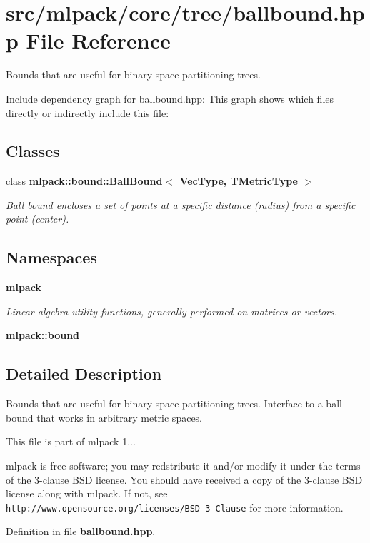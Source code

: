 \section{src/mlpack/core/tree/ballbound.hpp File Reference}
\label{ballbound_8hpp}


Bounds that are useful for binary space partitioning trees.  


Include dependency graph for ballbound.\-hpp\-:
This graph shows which files directly or indirectly include this file\-:
\subsection*{Classes}
\begin{DoxyCompactItemize}
\item 
class {\bf mlpack\-::bound\-::\-Ball\-Bound$<$ Vec\-Type, T\-Metric\-Type $>$}
\begin{DoxyCompactList}\small\item\em Ball bound encloses a set of points at a specific distance (radius) from a specific point (center). \end{DoxyCompactList}\end{DoxyCompactItemize}
\subsection*{Namespaces}
\begin{DoxyCompactItemize}
\item 
{\bf mlpack}
\begin{DoxyCompactList}\small\item\em Linear algebra utility functions, generally performed on matrices or vectors. \end{DoxyCompactList}\item 
{\bf mlpack\-::bound}
\end{DoxyCompactItemize}


\subsection{Detailed Description}
Bounds that are useful for binary space partitioning trees. Interface to a ball bound that works in arbitrary metric spaces.

This file is part of mlpack 1...

mlpack is free software; you may redstribute it and/or modify it under the terms of the 3-\/clause B\-S\-D license. You should have received a copy of the 3-\/clause B\-S\-D license along with mlpack. If not, see {\tt http\-://www.\-opensource.\-org/licenses/\-B\-S\-D-\/3-\/\-Clause} for more information. 

Definition in file {\bf ballbound.\-hpp}.

